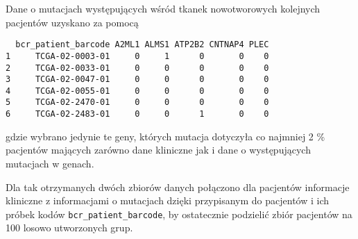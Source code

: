 Dane o mutacjach występujących wśród tkanek nowotworowych kolejnych
pacjentów uzyskano za pomocą

\begin{Shaded}
\begin{Highlighting}[]
\NormalTok{) ->}\StringTok{ }
\NormalTok{mutationsData[}\NormalTok{:}\NormalTok{, }\NormalTok{(}\NormalTok{,}\NormalTok{,}\NormalTok{,}\NormalTok{,}\NormalTok{,}\NormalTok{)]}
\end{Highlighting}
\end{Shaded}

\begin{verbatim}
  bcr_patient_barcode A2ML1 ALMS1 ATP2B2 CNTNAP4 PLEC
1     TCGA-02-0003-01     0     1      0       0    0
2     TCGA-02-0033-01     0     0      0       0    0
3     TCGA-02-0047-01     0     0      0       0    0
4     TCGA-02-0055-01     0     0      0       0    0
5     TCGA-02-2470-01     0     0      0       0    0
6     TCGA-02-2483-01     0     0      1       0    0
\end{verbatim}

gdzie wybrano jedynie te geny, których mutacja dotyczyła co najmniej 2
\% pacjentów mających zarówno dane kliniczne jak i dane o występujących
mutacjach w genach.

Dla tak otrzymanych dwóch zbiorów danych połączono dla pacjentów
informacje kliniczne z informacjami o mutacjach dzięki przypisanym do
pacjentów i ich próbek kodów \texttt{bcr\_patient\_barcode}, by
ostatecznie podzielić zbiór pacjentów na 100 losowo utworzonych grup.

\begin{Shaded}
\begin{Highlighting}[]
 \NormalTok{) ->}\StringTok{ }
\NormalTok{(coxData_split[[}\NormalTok{]][}\NormalTok{(}\NormalTok{,}\NormalTok{), }\NormalTok{(}\NormalTok{,}\NormalTok{,}\NormalTok{,}\NormalTok{,}\NormalTok{,}\NormalTok{:}\NormalTok{)])}
\end{Highlighting}
\end{Shaded}

